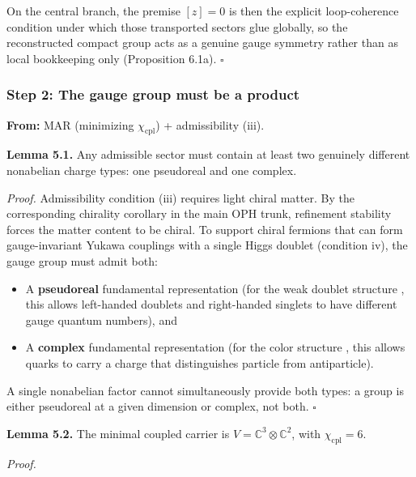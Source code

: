 On the central branch, the premise \([z] = 0\) is then the explicit loop-coherence condition under which those transported sectors glue globally, so the reconstructed compact group acts as a genuine gauge symmetry rather than as local bookkeeping only (Proposition 6.1a). \(\square\)

\subsubsection{Step 2: The gauge group must be a product}\label{step-2-the-gauge-group-must-be-a-product}

\textbf{From:} MAR (minimizing \(\chi_{\mathrm{cpl}}\)) + admissibility (iii).

\textbf{Lemma 5.1.} Any admissible sector must contain at least two genuinely different nonabelian charge types: one pseudoreal and one complex.

\emph{Proof.} Admissibility condition (iii) requires light chiral matter. By the corresponding chirality corollary in the main OPH trunk, refinement stability forces the matter content to be chiral. To support chiral fermions that can form gauge-invariant Yukawa couplings with a single Higgs doublet (condition iv), the gauge group must admit both:

\begin{itemize}
\tightlist
\item
  A \textbf{pseudoreal} fundamental representation (for the weak doublet structure , this allows left-handed doublets and right-handed singlets to have different gauge quantum numbers), and
\item
  A \textbf{complex} fundamental representation (for the color structure , this allows quarks to carry a charge that distinguishes particle from antiparticle).
\end{itemize}

A single nonabelian factor cannot simultaneously provide both types: a group is either pseudoreal at a given dimension or complex, not both. \(\square\)

\textbf{Lemma 5.2.} The minimal coupled carrier is \(V = \mathbb{C}^3 \otimes \mathbb{C}^2\), with \(\chi_{\mathrm{cpl}} = 6\).

\emph{Proof.}

